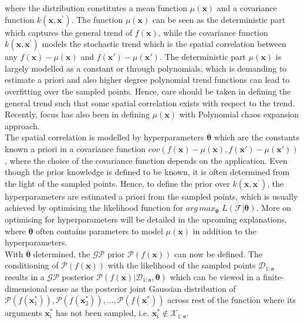 where the distribution constitutes a mean function $\mu(\bm{x})$ and a covariance function $k(\bm{x},\bm{x}^{'})$. The function $\mu(\bm{x})$ can be seen as the deterministic part which captures the general trend of $f(\bm{x})$, while the covariance function $k(\bm{x},\bm{x}^{'})$ models the stochastic trend which is the spatial correlation between any $f(\bm{x})-\mu(\bm{x})$ and $f(\bm{x}')-\mu(\bm{x}')$. 
The deterministic part $\mu(\bm{x})$ is largely modelled as a constant or through polynomials, which is demanding to estimate a priori and also higher degree polynomial trend functions can lead to overfitting over the sampled points. Hence, care should be taken in defining the general trend such that some spatial correlation exists with respect to the trend. Recently, focus has also been in defining $\mu(\bm{x})$ with Polynomial chaos expansion approach.\\

The spatial correlation is modelled by hyperparameters $\bm\theta$ which are the constants known a priori in a covariance function $cov(f(\bm{x})-\mu(\bm{x}),f(\bm{x}')-\mu(\bm{x}'))$, where the choice of the covariance function depends on the application. Even though the prior knowledge is defined to be known, it is often determined from the light of the sampled points. Hence, to define the prior over $k(\bm{x},\bm{x}^{'})$, the hyperparameters are estimated a priori from the sampled points, which is usually achieved by optimising the likelihood function for  $arg \, max_{\bm\theta} \,\, L(\mathcal{F}|\bm\theta)$. More on optimising for hyperparameters will be detailed in the upcoming explanations, where  $\bm\theta$ often contains parameters to model $\mu(\bm{x})$ in addition to the hyperparameters.\\

With $\bm\theta$ determined, the $\mathcal{GP}$ prior $\mathcal{P}(f(\bm{x}))$ can now be defined. The conditioning of $\mathcal{P}(f(\bm{x}))$ with the likelihood of the sampled points $\mathcal{D}_{1:{\mathfrak{n}}}$ results in a $\mathcal{GP}$ posterior $\mathcal{P}(f(\bm{x})|\mathcal{D}_{1:{\mathfrak{n}}},\bm\theta)$ which can be viewed in a finite-dimensional sense as the posterior joint Gaussian distribution of $\mathcal{P}(f(\bm{x}_1^*)),\mathcal{P}(f(\bm{x}_2^*)),\hdots,\mathcal{P}(f(\bm{x}_\mathfrak{.}^*))$ across rest of the function where its arguments $\bm{x}_\mathfrak{i}^*$ has not been sampled, i.e. $\bm{x}_\mathfrak{i}^* \notin \mathcal{X}_{1:{\mathfrak{n}}}$.\\
 
